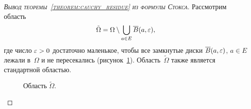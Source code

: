 \documentclass[../complex-analysis.tex]{subfiles}
\begin{document}
\begin{proof}[\normalfont\textsc{Вывод теоремы~\ref{theorem:cauchy_residue} из формулы Стокса}]
 Рассмотрим область
 \begin{align*}
  \tilde \Omega = \Omega \setminus \bigcup_{a \in E} \overline B(a,\varepsilon),
 \end{align*} где число $ \varepsilon > 0 $ достаточно маленькое, чтобы все замкнутые диски $ \overline B(a,\varepsilon) $, $ a \in E $ лежали в~$ \Omega $ и не пересекались (рисунок~\ref{fig:theorem_cauchy_omega_tilde}). Область~$ \tilde \Omega $ также является стандартной областью.

 \begin{figure}[ht]
  \centering
  \caption{Область $\tilde \Omega$.}
  \label{fig:theorem_cauchy_omega_tilde}
 \end{figure}


\end{proof}
\end{document}
